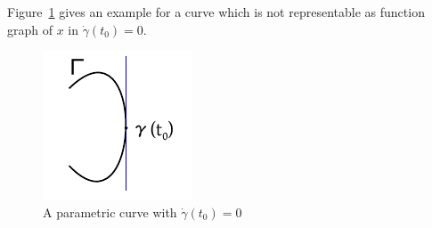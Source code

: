 \documentclass[a4paper,landscape,twocolumn]{article}
\theoremstyle{definition}
\begin{document}
Figure~\ref{img:parametriccurve} gives an example for a curve which is not representable as function graph of $x$ in $\dot\gamma(t_0) = 0$.

\begin{figure}[h!]
  \begin{center}
    \includegraphics{img/parametric_curve_hyperbola.pdf}
    \caption{A parametric curve with $\dot\gamma(t_0) = 0$}
    \label{img:parametriccurve}
  \end{center}
\end{figure}
\end{document}

